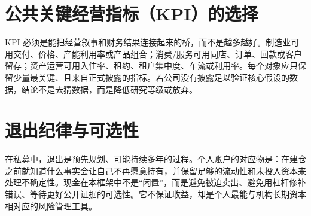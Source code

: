 \section{公共关键经营指标（KPI）的选择}

KPI 必须是能把经营叙事和财务结果连接起来的桥，而不是越多越好。制造业可用交付、价格、产能利用率或产品组合；消费/服务可用同店、订单、回款或客户留存；资产运营可用入住率、租约、租户集中度、车流或利用率。每个对象应只保留少量最关键、且来自正式披露的指标。若公司没有披露足以验证核心假设的数据，结论不是去猜数据，而是降低研究等级或放弃。

\section{退出纪律与可选性}

在私募中，退出是预先规划、可能持续多年的过程。个人账户的对应物是：在建仓之前就知道什么事实会让自己不再愿意持有，并保留足够的流动性和未投入资本来处理不确定性。现金在本框架中不是“闲置”，而是避免被迫卖出、避免用杠杆修补错误、等待更好公开证据的可选性。它不保证收益，却是个人最能与机构长期资本相对应的风险管理工具。
